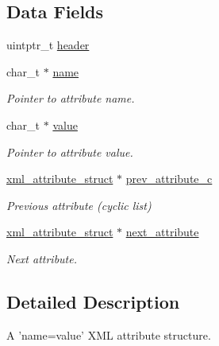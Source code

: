 \subsection*{Data Fields}
\begin{DoxyCompactItemize}
\item 
uintptr\-\_\-t \hyperlink{structpugi_1_1xml__attribute__struct_a0dca6ca6c129bbf87a7ebaf87f3e12de}{header}
\item 
char\-\_\-t $\ast$ \hyperlink{structpugi_1_1xml__attribute__struct_aa886c4aae23a132e1704717721ee2c19}{name}
\begin{DoxyCompactList}\small\item\em Pointer to attribute name. \end{DoxyCompactList}\item 
char\-\_\-t $\ast$ \hyperlink{structpugi_1_1xml__attribute__struct_ae652627d56cb9dcc0afdd1fbf6570364}{value}
\begin{DoxyCompactList}\small\item\em Pointer to attribute value. \end{DoxyCompactList}\item 
\hyperlink{structpugi_1_1xml__attribute__struct}{xml\-\_\-attribute\-\_\-struct} $\ast$ \hyperlink{structpugi_1_1xml__attribute__struct_a0e3a022235b316e4cfc1034ceb7d7862}{prev\-\_\-attribute\-\_\-c}
\begin{DoxyCompactList}\small\item\em Previous attribute (cyclic list) \end{DoxyCompactList}\item 
\hyperlink{structpugi_1_1xml__attribute__struct}{xml\-\_\-attribute\-\_\-struct} $\ast$ \hyperlink{structpugi_1_1xml__attribute__struct_a9860c0eb7fa72dc9b69ee9b0575f9efc}{next\-\_\-attribute}
\begin{DoxyCompactList}\small\item\em Next attribute. \end{DoxyCompactList}\end{DoxyCompactItemize}


\subsection{Detailed Description}
A 'name=value' X\-M\-L attribute structure. 

